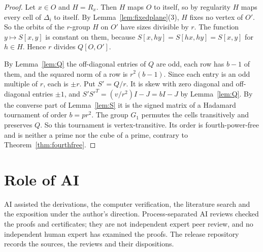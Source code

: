 \documentclass[11pt]{amsart}
\theoremstyle{definition}
\theoremstyle{remark}
\begin{document}
\begin{proof}
Let $x\in O$ and $H=R_x$. Then $H$ maps $O$ to itself, so by regularity $H$ maps every cell of $\Delta_i$ to itself. By Lemma~\ref{lem:fixedplane}(3), $H$ fixes no vertex of $O'$. So the orbits of the $r$-group $H$ on $O'$ have sizes divisible by $r$. The function $y\mapsto S[x,y]$ is constant on them, because $S[x,hy]=S[hx,hy]=S[x,y]$ for $h\in H$. Hence $r$ divides $Q[O,O']$.

By Lemma~\ref{lem:Q} the off-diagonal entries of $Q$ are odd, each row has $b-1$ of them, and the squared norm of a row is $r^2(b-1)$. Since each entry is an odd multiple of $r$, each is $\pm r$. Put $S'=Q/r$. It is skew with zero diagonal and off-diagonal entries $\pm1$, and $S'S'^{T}=(v/r^2)I-J=bI-J$ by Lemma~\ref{lem:Q}. By the converse part of Lemma~\ref{lem:S} it is the signed matrix of a Hadamard tournament of order $b=pr^2$. The group $G_1$ permutes the cells transitively and preserves $Q$. So this tournament is vertex-transitive. Its order is fourth-power-free and is neither a prime nor the cube of a prime, contrary to Theorem~\ref{thm:fourthfree}.
\end{proof}

\section*{Role of AI}
AI assisted the derivations, the computer verification, the literature search and the exposition under the author's direction. Process-separated AI reviews checked the proofs and certificates; they are not independent expert peer review, and no independent human expert has examined the proofs. The release repository records the sources, the reviews and their dispositions.
\end{document}

